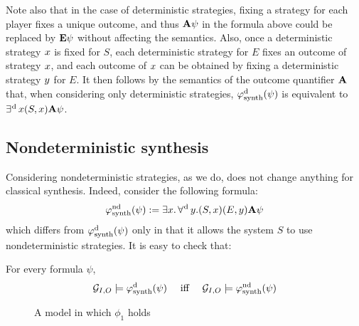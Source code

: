 Note also that in the case of deterministic strategies, fixing a
strategy for each player fixes a unique outcome, and thus ${\bf A}\psi$ in
the formula above could be replaced by ${\bf E}\psi$ without affecting the semantics.
Also, once a deterministic strategy $x$ is fixed for $S$, each
deterministic strategy for $E$ fixes an outcome of strategy $x$, and each outcome
of $x$ can be obtained by fixing a deterministic strategy $y$
for $E$. It then follows by the
semantics of the outcome quantifier ${\bf A}$ that, when
considering only deterministic strategies,
$\varphi^{\text{d}}_{\text{synth}}(\psi)$ is equivalent to $\operatorname*{\exists^{\hskip.5pt\text{d}}} x (S,x){\bf A}\psi$.

\subsection{Nondeterministic synthesis}
\label{sec-nd-synth}

Considering nondeterministic strategies, as we do, does not change
anything for classical \LTL synthesis. Indeed, consider the following
formula:
\[\varphi^{\text{nd}}_{\text{synth}}(\psi):=\exists x.   \operatorname*{\forall^{\hskip.5pt\text{d}}} y.
 (S,x)(E,y) {\bf A} \psi\]
which differs from $\varphi^{\text{d}}_{\text{synth}}(\psi)$ only in that it allows the system
$S$ to use nondeterministic strategies. It is easy to check that:
\begin{proposition}
  \label{prop-equiv-synth}
  For every \LTL formula $\psi$, \[\CGS_{I,O}\models
  \phisynthdet(\psi) \quad\mbox{ iff } \quad\CGS_{I,O}\models \phisynthndet(\psi)\]
\end{proposition}

\begin{figure}
  \centering
{}  
  \caption{A model in which $\phi_1$ holds}
  \label{fig:example}
\end{figure}


